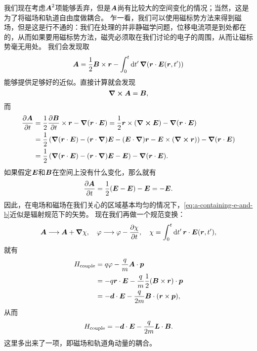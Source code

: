 \documentclass[UTF8, a4paper]{ctexart}
\begin{document}
我们现在考虑$\vb*{A}^2$项能够丢弃，但是$\vb*{A}$尚有比较大的空间变化的情况；当然，这是为了将磁场和轨道自由度做耦合。
乍一看，我们可以使用磁标势方法来得到磁场，但是这是行不通的：我们在处理的并非静磁学问题，位移电流项是到处都在的，从而如果要用磁标势方法，磁壳必须取在我们讨论的电子的周围，从而让磁标势毫无用处。
我们会发现取
\begin{equation}
    \vb*{A} = \frac{1}{2} \vb*{B} \times \vb*{r} - \int_0^t \dd{t'} \grad(\vb*{r} \cdot \vb*{E}(\vb*{r}, t'))
    \label{eq:a-containing-e-and-b}
\end{equation}
能够提供足够好的近似。直接计算就会发现
\[
    \curl{\vb*{A}} = \vb*{B},
\]
而
\[
    \begin{aligned}
        \pdv{\vb*{A}}{t} &= \frac{1}{2} \pdv{\vb*{B}}{t} \times \vb*{r} - \grad{(\vb*{r} \cdot \vb*{E})} = \frac{1}{2} \vb*{r} \times (\curl{\vb*{E}}) - \grad{(\vb*{r} \cdot \vb*{E})} \\
        &= \frac{1}{2} \left( \grad{(\vb*{r} \cdot \vb*{E})} - (\vb*{r} \cdot \grad) \vb*{E} - (\vb*{E} \cdot \grad) \vb*{r} - \vb*{E} \times (\curl{\vb*{r}}) \right) - \grad{(\vb*{r} \cdot \vb*{E})} \\
        &= \frac{1}{2} \left( \grad{(\vb*{r} \cdot \vb*{E})} - (\vb*{r} \cdot \grad) \vb*{E} - \vb*{E} \right)- \grad{(\vb*{r} \cdot \vb*{E})} .
    \end{aligned}
\]
如果假定$\vb*{E}$和$\vb*{B}$在空间上没有什么变化，那么就有
\[
    \pdv{\vb*{A}}{t} = \frac{1}{2} (\vb*{E} - \vb*{E}) - \vb*{E} = - \vb*{E}.
\]
因此，在电场和磁场在我们关心的区域基本均匀的情况下，\eqref{eq:a-containing-e-and-b}近似是辐射规范下的矢势。
现在我们再做一个规范变换：
\[
    \vb*{A} \longrightarrow \vb*{A} + \grad{\chi}, \quad \varphi \longrightarrow \varphi - \pdv{\chi}{t}, \quad \chi = \int_0^t \dd{t'} \vb*{r} \cdot \vb*{E}(\vb*{r}, t'),
\]
就有
\[
    \begin{aligned}
        H_\text{couple} &= q \varphi - \frac{q}{m} \vb*{A} \cdot \vb*{p} \\
        &= - q \vb*{r} \cdot \vb*{E} - \frac{q}{m} \frac{1}{2} (\vb*{B} \times \vb*{r}) \cdot \vb*{p} \\
        &= - \vb*{d} \cdot \vb*{E} - \frac{q}{2m} \vb*{B} \cdot (\vb*{r} \times \vb*{p}),
    \end{aligned}
\]
从而
\begin{equation}
    H_\text{couple} = - \vb*{d} \cdot \vb*{E} - \frac{q}{2m} \vb*{L} \cdot \vb*{B}.
\end{equation}
这里多出来了一项，即磁场和轨道角动量的耦合。
\end{document}

